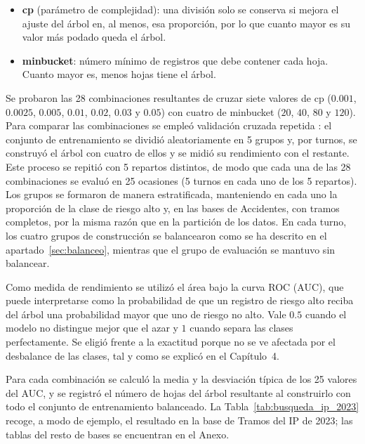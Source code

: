 \documentclass[twoside,a4paper,12pt,onecolumn,openany]{book}
\begin{document}
\begin{itemize}
    \item \textbf{cp} (parámetro de complejidad): una división solo se conserva si mejora el ajuste del árbol en, al menos, esa proporción, por lo que cuanto mayor es su valor más podado queda el árbol.
 
    \item \textbf{minbucket}: número mínimo de registros que debe contener cada hoja. Cuanto mayor es, menos hojas tiene el árbol.
\end{itemize}
 
Se probaron las 28 combinaciones resultantes de cruzar siete valores de cp ($0.001$, $0.0025$, $0.005$, $0.01$, $0.02$, $0.03$ y $0.05$) con cuatro de minbucket ($20$, $40$, $80$ y $120$). Para comparar las combinaciones se empleó validación cruzada repetida \cite{tema3_clasificacion}: el conjunto de entrenamiento se dividió aleatoriamente en 5 grupos y, por turnos, se construyó el árbol con cuatro de ellos y se midió su rendimiento con el restante. Este proceso se repitió con 5 repartos distintos, de modo que cada una de las 28 combinaciones se evaluó en 25 ocasiones (5 turnos en cada uno de los 5 repartos). Los grupos se formaron de manera estratificada, manteniendo en cada uno la proporción de la clase de riesgo alto y, en las bases de Accidentes, con tramos completos, por la misma razón que en la partición de los datos. En cada turno, los cuatro grupos de construcción se balancearon como se ha descrito en el apartado~\ref{sec:balanceo}, mientras que el grupo de evaluación se mantuvo sin balancear.
 
\vspace{0.5cm}
 
Como medida de rendimiento se utilizó el área bajo la curva ROC (AUC), que puede interpretarse como la probabilidad de que un registro de riesgo alto reciba del árbol una probabilidad mayor que uno de riesgo no alto. Vale $0.5$ cuando el modelo no distingue mejor que el azar y $1$ cuando separa las clases perfectamente. Se eligió frente a la exactitud porque no se ve afectada por el desbalance de las clases, tal y como se explicó en el Capítulo~4.
 
\vspace{0.5cm}
 
Para cada combinación se calculó la media y la desviación típica de los 25 valores del AUC, y se registró el número de hojas del árbol resultante al construirlo con todo el conjunto de entrenamiento balanceado. La Tabla~\ref{tab:busqueda_ip_2023} recoge, a modo de ejemplo, el resultado en la base de Tramos del IP de 2023; las tablas del resto de bases se encuentran en el Anexo.
 
\end{document}
